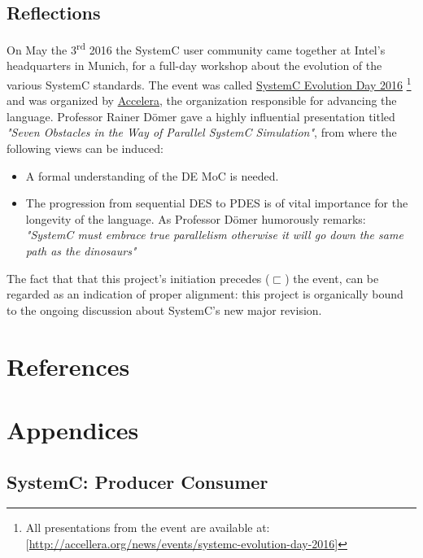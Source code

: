 \documentclass[11pt]{article}
\begin{document}
\subsection{Reflections}
\label{sec:org2d327d2}
On May the 3\textsuperscript{rd} 2016 the SystemC user community came together at Intel's headquarters in Munich, 
for a full-day workshop about the evolution of the various SystemC standards.
The event was called \href{http://accellera.org/news/events/systemc-evolution-day-2016}{SystemC Evolution Day 2016}  \footnote{All presentations from the event are available at: [\url{http://accellera.org/news/events/systemc-evolution-day-2016}]} and was organized by \href{http://accellera.org/about}{Accelera}, the organization responsible for advancing the language.
Professor Rainer Dömer gave a highly influential presentation titled \textit{"Seven Obstacles in the Way of Parallel SystemC Simulation"}, 
from where the following views can be induced:
\begin{itemize}
\item A formal understanding of the DE MoC is needed.
\item The progression from sequential DES to PDES is of vital importance for the longevity of the language. 
As Professor Dömer humorously remarks: \textit{"SystemC must embrace true parallelism otherwise it will go down the same path as the dinosaurs"}
\end{itemize}

The fact that that this project's initiation precedes (\(\sqsubset\)) the event, can be regarded as an indication of proper alignment:
this project is organically bound to the ongoing discussion about SystemC's new major revision.

\clearpage

\section{References}
\label{sec:orge40d6fe}
\renewcommand\refname{}


\clearpage

\appendix
\section*{Appendices}
\renewcommand{\thesubsection}{\Alph{subsection}}
\subsection{SystemC: Producer Consumer}
\label{AppendixA}
\end{document}
